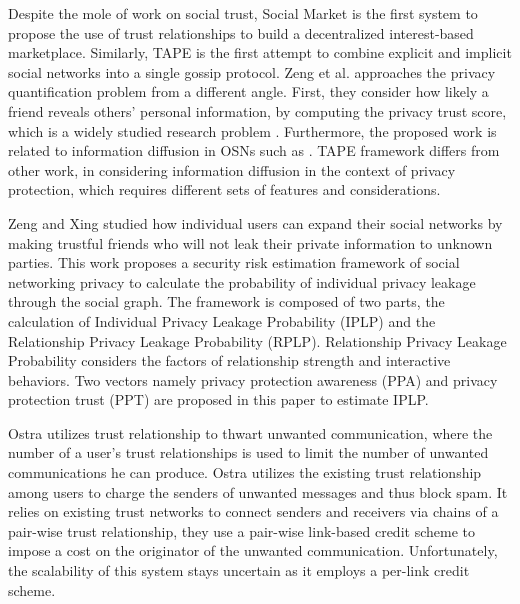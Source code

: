 Despite the mole of work on social trust,
	Social Market \cite{frey_social_2011} is the first system to propose the use of trust relationships to build a decentralized interest-based marketplace.
Similarly,
	TAPE \cite{yongbozeng_study_2015} is the first attempt to combine explicit and implicit social networks into a single gossip protocol.
Zeng et al. \cite{yongbozeng_study_2015} approaches the privacy quantification problem from a different angle.
First,
	they consider how likely a friend reveals others’ personal information,
	by computing the privacy trust score,
	which is a widely studied research problem \cite{gundecha_exploiting_2011}.
Furthermore,
	the proposed work is related to information diffusion in OSNs such as \cite{fang_privacy_2010}.
TAPE framework differs from other work,
	in considering information diffusion in the context of privacy protection,
	which requires different sets of features and considerations.

Zeng and Xing \cite{zeng_trustaware_2014}
	studied how individual users can expand their social networks by making trustful friends who will not leak their private information to unknown parties.
This work proposes a security risk estimation framework of social networking privacy to calculate the probability of individual privacy leakage through the social graph.
The framework is composed of two parts,
	the calculation of Individual Privacy Leakage Probability (IPLP) and the Relationship Privacy Leakage Probability (RPLP).
Relationship Privacy Leakage Probability considers the factors of relationship strength and interactive behaviors.
Two vectors namely privacy protection awareness (PPA) and privacy protection trust (PPT) are proposed in this paper to estimate IPLP.


Ostra \cite{mislove_ostra_2008} utilizes trust relationship to thwart unwanted communication,
	where the number of a user’s trust relationships is used to limit the number of unwanted communications he can produce.
Ostra utilizes the existing trust relationship among users to charge the senders of unwanted messages and thus block spam.
It relies on existing trust networks to connect senders and receivers via chains of a pair-wise trust relationship,
	they use a pair-wise link-based credit scheme to impose a cost on the originator of the unwanted communication.
Unfortunately,
	the scalability of this system stays uncertain as it employs a per-link credit scheme.

